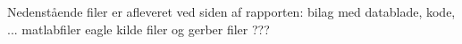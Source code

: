 Nedenstående filer er afleveret ved siden af rapporten:
bilag med datablade, kode, ...
matlabfiler
eagle kilde filer og gerber filer
???


